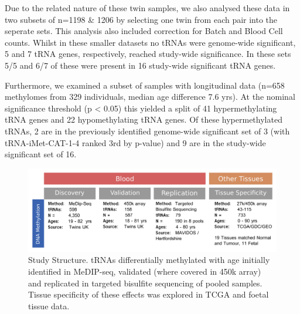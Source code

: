\documentclass[]{book}
\begin{document}
Due to the related nature of these twin samples, we also analysed these data in two subsets of n=1198 \& 1206 by selecting one twin from each pair into the seperate sets.
This analysis also included correction for Batch and Blood Cell counts.
Whilst in these smaller datasets no tRNAs were genome-wide significant, 5 and 7 tRNA genes, respectively, reached study-wide significance.
In these sets 5/5 and 6/7 of these were present in 16 study-wide significant tRNA genes.

Furthermore, we examined a subset of samples with longitudinal data (n=658 methylomes from 329 individuals, median age difference 7.6 yrs).
At the nominal significance threshold (p \textless{} 0.05) this yielded a split of 41 hypermethylating tRNA genes and 22 hypomethylating tRNA genes.
Of these hypermethylated tRNAs, 2 are in the previously identified genome-wide significant set of 3 (with tRNA-iMet-CAT-1-4 ranked 3rd by p-value) and 9 are in the study-wide significant set of 16.

\begin{figure}

{\centering \includegraphics[width=1\linewidth]{figs/OverviewOfAnalysesFigure_tRNA_3} 

}

\caption{Study Structure. tRNAs differentially methylated with age initially identified in MeDIP-seq, validated (where covered in 450k array) and replicated in targeted bisulfite sequencing of pooled samples. Tissue specificity of these effects was explored in TCGA and foetal tissue data.}\label{fig:OverviewOfAnalyses}
\end{figure}
\end{document}
